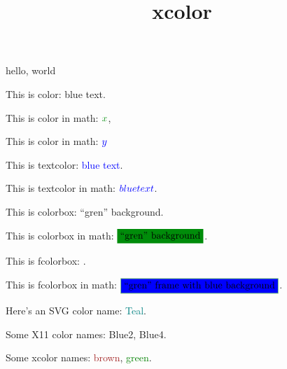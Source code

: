 \documentclass{amsart}
\title{xcolor}
\begin{document}
\maketitle

hello, world



This is color: {\color{blue} blue text}.

This is color in math: $\color{gren} x$,

This is color in math: $\color{blue} y$

This is textcolor: \textcolor{blue}{blue text}.

This is textcolor in math: $\textcolor{blue}{blue text}$.

This is colorbox: \colorbox{gren}{``gren'' background}.

This is colorbox in math: $\colorbox{gren}{``gren'' background}$.

This is fcolorbox: .

This is fcolorbox in math: $\fcolorbox{gren}{blue}{``gren'' frame with blue background}$.

Here's an SVG color name: \textcolor{Teal}{Teal}.

Some X11 color names: \textcolor{Blue2}{Blue2}, \textcolor{Blue4}{Blue4}.

Some xcolor names: \textcolor{brown}{brown}, \textcolor{green}{green}.
\end{document}
